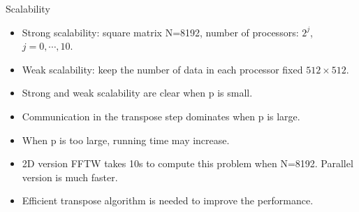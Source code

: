 \documentclass{beamer}
\begin{document}
\begin{frame}{Scalability}
\begin{itemize}
\item Strong scalability: square matrix N=8192, number of processors: $2^{j}$, $j=0,\cdots,10$. 
\item Weak scalability: keep the number of data in each processor fixed $512\times512$.
\end{itemize}
\begin{figure}
\end{figure}
\end{frame}

\begin{frame}
\begin{itemize}
\item Strong and weak scalability are clear when p is small. 
\item Communication in the transpose step dominates when p is large.
\item When p is too large, running time may increase.
\item 2D version FFTW takes 10s to compute this problem when N=8192. Parallel version is much faster.
\item Efficient transpose algorithm is needed to improve the performance.
\end{itemize}
\end{frame}
\end{document}
